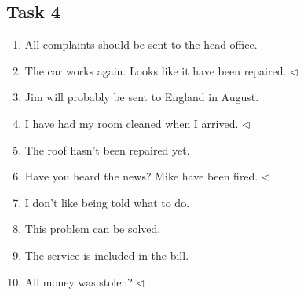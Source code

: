 \subsection*{Task 4}

\begin{enumerate}
	\item All complaints should be sent to the head office.
	\item The car works again. Looks like it have been repaired. $ \triangleleft $
	\item Jim will probably be sent to England in August.
	\item I have had my room cleaned when I arrived. $ \triangleleft $
	\item The roof hasn't been repaired yet.
	\item Have you heard the news? Mike have been fired. $ \triangleleft $
	\item I don't like being told what to do.
	\item This problem can be solved.
	\item The service is included in the bill.
	\item All money was stolen? $ \triangleleft $
\end{enumerate}

